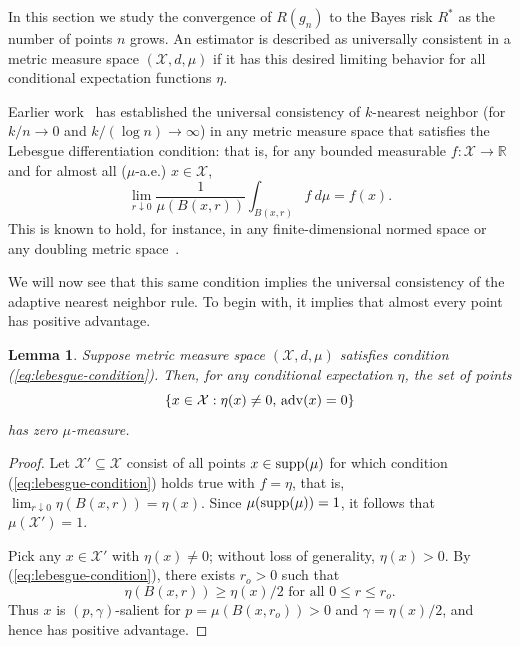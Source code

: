 \documentclass{article}
\def\R{{\mathbb{R}}}
\def\X{{\mathcal X}}
\def\supp{{\rm supp}}
\def\adv{{\rm adv}}
\newtheorem{lemma}[theorem]{Lemma}
\newcommand{\new}[1]{\color{red} #1}
\begin{document}
In this section we study the convergence of $R(g_n)$ to the Bayes risk $R^*$ as the number of points $n$ grows. An estimator is described as universally consistent in a metric measure space $(\X, d, \mu)$ if it has this desired limiting behavior for all conditional expectation functions $\eta$.

Earlier work~\cite{ChaudhuriDasgupta2014} has established the universal consistency of $k$-nearest neighbor (for $k/n \rightarrow 0$ and $k/(\log n) \rightarrow \infty$) in any metric measure space that satisfies the Lebesgue differentiation condition: that is, for any bounded measurable $f: \X \rightarrow \R$ and for almost all ($\mu$-a.e.) $x \in \X$,
\begin{equation}
\lim_{r \downarrow 0} \frac{1}{\mu(B(x,r))} \int_{B(x,r)} f \ d\mu = f(x) .
\label{eq:lebesgue-condition}
\end{equation}
This is known to hold, for instance, in any finite-dimensional normed space or any doubling metric space~\cite[Chapter 1]{H01}.

We will now see that this same condition implies the universal consistency of the adaptive nearest neighbor rule. To begin with, it implies that almost every point has positive advantage.
\begin{lemma}
Suppose metric measure space $(\X, d, \mu)$ satisfies condition (\ref{eq:lebesgue-condition}). Then,
{\new{for any conditional expectation $\eta$}}, the set of points
$$ \{x \in \X: \eta(x) \neq 0, \, \adv(x) = 0\}$$
has zero $\mu$-measure.
\label{lemma:positive-advantage}
\end{lemma}
\begin{proof}
Let $\X' \subseteq \X$ consist of all points $x \in \supp(\mu)$ for which condition (\ref{eq:lebesgue-condition}) holds true with $f=\eta$, that is, $\lim_{r \downarrow 0} \eta(B(x,r)) = \eta(x)$. 
Since $\mu(\supp(\mu))=1$, it follows that $\mu(\X') = 1$. 

Pick any $x \in \X'$ with $\eta(x) \neq 0$; without loss of generality, $\eta(x) > 0$. By (\ref{eq:lebesgue-condition}), there exists $r_o > 0$ such that
$$\eta(B(x,r)) \geq \eta(x)/2 \mbox{\  for all \ } 0 \leq r \leq r_o.$$
Thus $x$ is $(p,\gamma)$-salient for $p = \mu(B(x,r_o)) > 0$ and $\gamma = \eta(x)/2$, and hence has positive advantage.
\end{proof}
\end{document}
